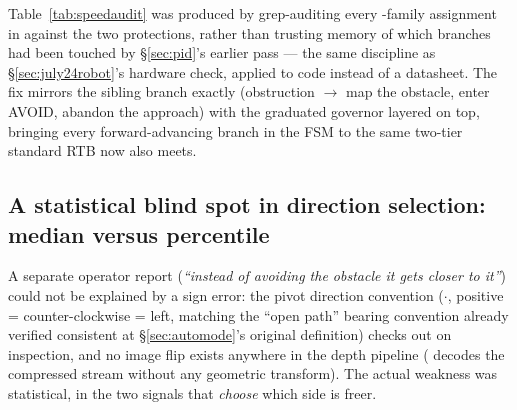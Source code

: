 Table~\ref{tab:speedaudit} was produced by grep-auditing every
-family assignment in  against
the two protections, rather than trusting memory of which branches had
been touched by \S\ref{sec:pid}'s earlier pass — the same discipline as
\S\ref{sec:july24robot}'s hardware check, applied to code instead of a
datasheet. The fix mirrors the sibling branch exactly (obstruction
$\to$ map the obstacle, enter AVOID, abandon the approach) with the
graduated governor layered on top, bringing every forward-advancing branch
in the FSM to the same two-tier standard RTB now also meets.

\subsection{A statistical blind spot in direction selection: median versus
percentile}
\label{sec:july24percentile}
A separate operator report (\emph{``instead of avoiding the obstacle it
gets closer to it''}) could not be explained by a sign error: the pivot
direction convention ($\cdot$,
positive = counter-clockwise = left, matching the ``open path'' bearing
convention already verified consistent at \S\ref{sec:automode}'s original
definition) checks out on inspection, and no image flip exists anywhere in
the depth pipeline ( decodes the
compressed stream without any geometric transform). The actual weakness
was statistical, in the two signals that \emph{choose} which side is
freer.

